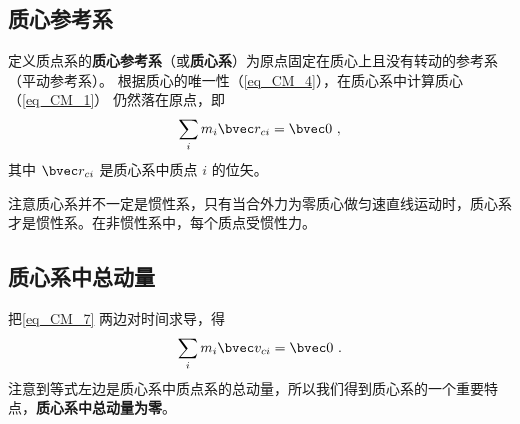 \subsection{质心参考系}\label{sub_CM_2}
定义质点系的\textbf{质心参考系}（或\textbf{质心系}）为原点固定在质心上且没有转动的参考系（平动参考系）。%
根据质心的唯一性（\autoref{eq_CM_4}），在质心系中计算质心（\autoref{eq_CM_1}） 仍然落在原点，即
\begin{equation}\label{eq_CM_7}
\sum_i m_i \bvec r_{ci} = \bvec 0~,
\end{equation}
其中 $\bvec r_{ci}$ 是质心系中质点 $i$ 的位矢。

注意质心系并不一定是惯性系，只有当合外力为零质心做匀速直线运动时，质心系才是惯性系。在非惯性系中，每个质点受惯性力。

\subsection{质心系中总动量}
把\autoref{eq_CM_7} 两边对时间求导，得
\begin{equation}\label{eq_CM_8}
\sum_i m_i \bvec v_{ci} = \bvec 0~.
\end{equation}
注意到等式左边是质心系中质点系的总动量，所以我们得到质心系的一个重要特点，\textbf{质心系中总动量为零}。

